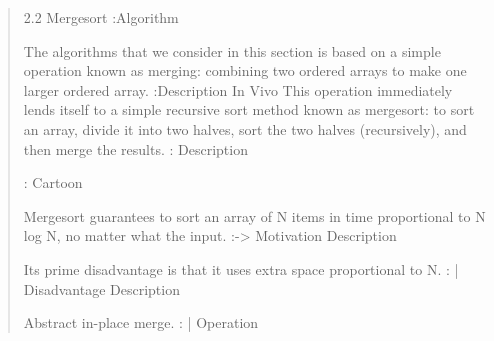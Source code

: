 \begin{quote}

  2.2 Mergesort :Algorithm
  
  The algorithms that we consider in this section is based on a simple operation
  known as merging: combining two ordered arrays to make one larger ordered
  array. :Description In Vivo
  This operation immediately lends itself to a simple recursive sort
  method known as mergesort: to sort an array, divide it into two halves, sort
  the two halves (recursively), and then merge the results. : Description

   : Cartoon

  Mergesort guarantees to sort an array of N items in time proportional to N log
  N, no matter what the input. :-> Motivation Description

  Its prime disadvantage is that it uses extra space proportional to N. : |
  Disadvantage Description

  Abstract in-place merge. : | Operation

\end{quote}